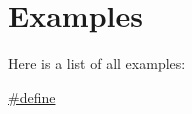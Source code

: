 \section{Examples}
Here is a list of all examples\+:\begin{DoxyCompactItemize}
\item 
\hyperlink{#define-example}{\#define}
\end{DoxyCompactItemize}
